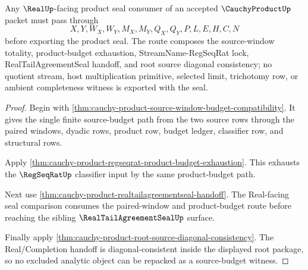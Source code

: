 \begin{theorem}
\label{thm:cauchy-product-real-seal-source-budget-nonescape}
Any $\RealUp$-facing product seal consumer of an accepted $\CauchyProductUp$ packet must pass through
$$
X,Y,W_X,W_Y,M_X,M_Y,Q_X,Q_Y,P,L,E,H,C,N
$$
before exporting the product seal. The route composes the source-window totality, product-budget exhaustion, StreamName-RegSeqRat lock, RealTailAgreementSeal handoff, and root source diagonal consistency; no quotient stream, host multiplication primitive, selected limit, trichotomy row, or ambient completeness witness is exported with the seal.
\end{theorem}
\begin{proof}
Begin with \autoref{thm:cauchy-product-source-window-budget-compatibility}. It gives the single finite source-budget path from the two source rows through the paired windows, dyadic rows, product row, budget ledger, classifier row, and structural rows.

Apply \autoref{thm:cauchy-product-regseqrat-product-budget-exhaustion}. This exhausts the $\RegSeqRatUp$ classifier input by the same product-budget path.

Next use \autoref{thm:cauchy-product-realtailagreementseal-handoff}. The Real-facing seal comparison consumes the paired-window and product-budget route before reaching the sibling $\RealTailAgreementSealUp$ surface.

Finally apply \autoref{thm:cauchy-product-root-source-diagonal-consistency}. The Real/Completion handoff is diagonal-consistent inside the displayed root package, so no excluded analytic object can be repacked as a source-budget witness.
\end{proof}

